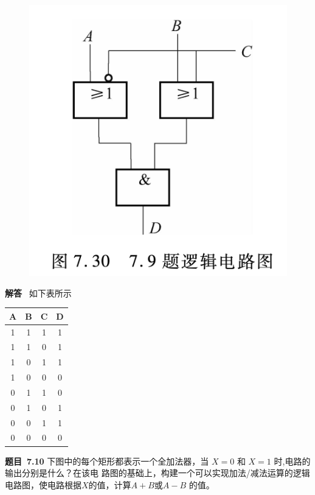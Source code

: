 \documentclass[10pt,a4paper,UTF8]{ctexart}
\newcommand{\problemname}{待定义}
\newenvironment{problem}{\begin{shaded}\par\noindent\textbf{题目\  \problemname}}{\end{shaded}\par}
\newenvironment{solution}{\par\noindent\textbf{解答}\ }{\par}
\begin{document}
\begin{figure}[H]
	\centering
	\includegraphics[scale=0.25]{img/7.9.png}
\end{figure}

\begin{solution}
	如下表所示
	\begin{table}[H]
		\centering
		\begin{tabular}{|c|c|c|c|}
		\hline
		A & B & C & D \\ \hline
		1 & 1 & 1 & 1 \\ \hline
		1 & 1 & 0 & 1 \\ \hline
		1 & 0 & 1 & 1 \\ \hline
		1 & 0 & 0 & 0 \\ \hline
		0 & 1 & 1 & 0 \\ \hline
		0 & 1 & 0 & 1 \\ \hline
		0 & 0 & 1 & 1 \\ \hline
		0 & 0 & 0 & 0 \\ \hline
		\end{tabular}
	\end{table}
\end{solution}


\renewcommand{\problemname}{7.10}
\begin{problem}
	下图中的每个矩形都表示一个全加法器，当 $X=0$ 和 $X=1$ 时,电路的输出分别是什么？在该电
	路图的基础上，构建一个可以实现加法/减法运算的逻辑电路图，使电路根据$X$的值，计算$A+B$或$A-B$
	的值。
\end{problem}
\end{document}
